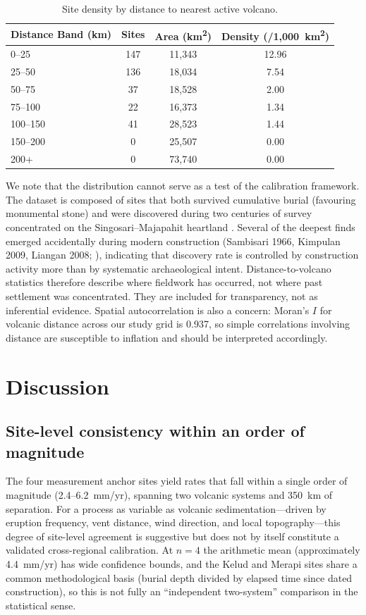 \documentclass[12pt,a4paper]{article}
\begin{document}
\begin{table}[t]
\caption{Site density by distance to nearest active volcano.}
\label{tab:density}
\begin{tabular}{lccc}
\toprule
Distance Band (km) & Sites & Area (km\textsuperscript{2}) & Density (/1,000~km\textsuperscript{2}) \\
\midrule
0--25 & 147 & 11,343 & 12.96 \\
25--50 & 136 & 18,034 & 7.54 \\
50--75 & 37 & 18,528 & 2.00 \\
75--100 & 22 & 16,373 & 1.34 \\
100--150 & 41 & 28,523 & 1.44 \\
150--200 & 0 & 25,507 & 0.00 \\
200+ & 0 & 73,740 & 0.00 \\
\bottomrule
\end{tabular}
\end{table}

We note that the distribution cannot serve as a test of the calibration framework. The dataset is composed of sites that both survived cumulative burial (favouring monumental stone) and were discovered during two centuries of survey concentrated on the Singosari--Majapahit heartland \citep{kinney2003}. Several of the deepest finds emerged accidentally during modern construction (Sambisari 1966, Kimpulan 2009, Liangan 2008; \citealp{putra2019,abbas2016}), indicating that discovery rate is controlled by construction activity more than by systematic archaeological intent. Distance-to-volcano statistics therefore describe where fieldwork has occurred, not where past settlement was concentrated. They are included for transparency, not as inferential evidence. Spatial autocorrelation is also a concern: Moran's $I$ for volcanic distance across our study grid is 0.937, so simple correlations involving distance are susceptible to inflation and should be interpreted accordingly.


\section{Discussion}

\subsection{Site-level consistency within an order of magnitude}

The four measurement anchor sites yield rates that fall within a single order of magnitude (2.4--6.2~mm/yr), spanning two volcanic systems and 350~km of separation. For a process as variable as volcanic sedimentation---driven by eruption frequency, vent distance, wind direction, and local topography---this degree of site-level agreement is suggestive but does not by itself constitute a validated cross-regional calibration. At $n=4$ the arithmetic mean (approximately 4.4~mm/yr) has wide confidence bounds, and the Kelud and Merapi sites share a common methodological basis (burial depth divided by elapsed time since dated construction), so this is not fully an ``independent two-system'' comparison in the statistical sense.
\end{document}
